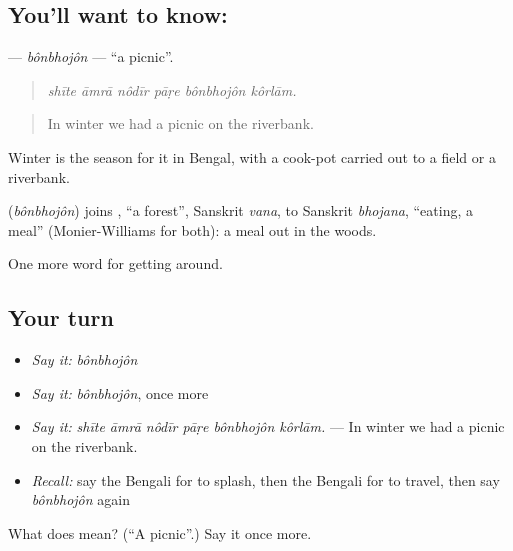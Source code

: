 \subsection*{You'll want to know: }
\textbf{} — \emph{bônbhojôn} — \textquotedblleft{}a picnic\textquotedblright{}.

\begin{quote}
     
\end{quote}

\begin{quote}
\emph{shīte āmrā nôdīr pāṛe bônbhojôn kôrlām.}
\end{quote}

\begin{quote}
In winter we had a picnic on the riverbank.
\end{quote}

Winter is the season for it in Bengal, with a cook-pot carried out to a field or a riverbank.

\begin{cousinweb}
\textbf{} (\emph{bônbhojôn}) joins \textbf{}, \textquotedblleft{}a forest\textquotedblright{}, Sanskrit \emph{vana}, to Sanskrit \emph{bhojana}, \textquotedblleft{}eating, a meal\textquotedblright{} (Monier-Williams for both): a meal out in the woods.
\end{cousinweb}

\begin{grammarlens}[title={What you've built}]
One more word for getting around.
\end{grammarlens}

\subsection*{Your turn}
\begin{itemize}
\raggedright
  \item \emph{Say it:} \emph{bônbhojôn}
  \item \emph{Say it:} \emph{bônbhojôn}, once more
  \item \emph{Say it:} \emph{shīte āmrā nôdīr pāṛe bônbhojôn kôrlām.} — In winter we had a picnic on the riverbank.
  \item \emph{Recall:} say the Bengali for to splash, then the Bengali for to travel, then say \emph{bônbhojôn} again
\end{itemize}

\begin{tcolorbox}[breakable,colback=teal!4,colframe=teal!35!black,title={Before you move on}]
What does  mean? (\textquotedblleft{}A picnic\textquotedblright{}.) Say it once more.
\end{tcolorbox}
